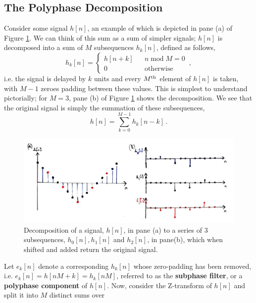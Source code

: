 \subsection{The Polyphase Decomposition}
%
Consider some signal $h[n]$, an example of which is depicted in pane (a) of
Figure \ref{fig::lecture_15_subphase_filters}. We can think
of this sum as a sum of simpler signals; $h[n]$ is decomposed into a sum of $M$
subsequences $h_k[n]$, defined as follows,
%
\begin{displaymath}
  h_k[n] = \left\{\begin{array}{ccl}
  h[n+k] & &  n\;\mathrm{mod}\;M = 0 \\
  0 & & \mathrm{otherwise}
  \end{array}\right. \,,
\end{displaymath}
%
i.e. the signal is delayed by $k$ units and every $M^\mathrm{th}\mkern1mu$ element of $h[n]$ is taken, with $M-1$
zeroes padding between these values. This is simplest to understand pictorially;
for $M=3$, pane (b) of Figure \ref{fig::lecture_15_subphase_filters} shows the decomposition.
We see that the original signal is simply the summation of these subsequences,
%
\begin{displaymath}
  h[n] = \sum_{k=0}^{M-1}h_k[n-k] \,.
\end{displaymath}
%
\begin{figure}[H]
  \includegraphics[width=\textwidth]{images/lecture_15_subphase_filters.JPG}
  \caption{Decomposition of a signal, $h[n]$, in pane (a) to a series of 3
    subsequences, $h_0[n], h_1[n]$ and $h_2[n]$, in pane(b), which when shifted and
    added return the original signal.
  }
  \label{fig::lecture_15_subphase_filters}
\end{figure}
%
Let $e_k[n]$ denote a corresponding $h_k[n]$ whose zero-padding has been removed, i.e.
$e_k[n] = h[nM + k] = h_k[nM]$, referred to as the \textbf{subphase filter}, or a
\textbf{polyphase component} of $h[n]$.
Now, consider the Z-transform of $h[n]$ and split it into $M$ distinct sums over
